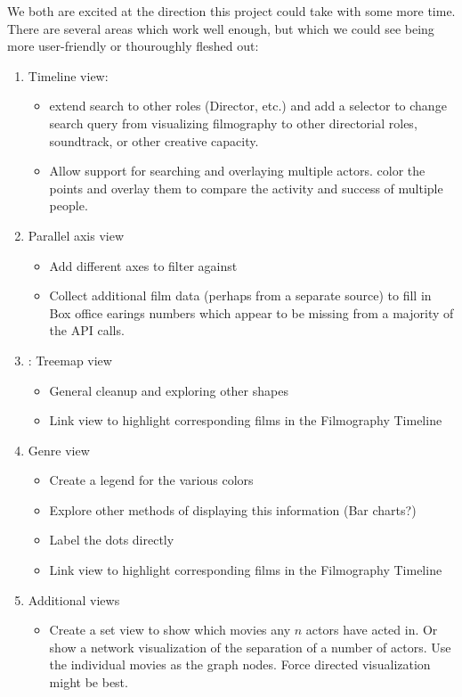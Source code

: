 \documentclass[12pt]{article}
\begin{document}
We both are excited at the direction this project could take with some more time.  There are several areas which work well enough, but which we could see being more user-friendly or thouroughly fleshed out:


\begin{enumerate}

	\item Timeline view:
		\begin{itemize}
			\item extend search to other roles (Director, etc.) and add a selector to change search query from visualizing filmography to other directorial roles, soundtrack, or other creative capacity.  
			\item Allow support for searching and overlaying multiple actors. color the points and overlay them to compare the activity and success of multiple people.
		\end{itemize}
		
	\item Parallel axis view
		\begin{itemize}
			\item Add different axes to filter against
			\item Collect additional film data (perhaps from a separate source) to fill in Box office earings numbers which appear to be missing from a majority of the API calls.
		\end{itemize}
	
	\item: Treemap view
		\begin{itemize}
			\item General cleanup  and exploring other shapes
			\item Link view to highlight corresponding films in the Filmography Timeline
		\end{itemize}

	\item Genre view
		\begin{itemize}
			\item Create a legend for the various colors
			\item Explore other methods of displaying this information (Bar charts?)
			\item Label the dots directly
			\item Link view to highlight corresponding films in the Filmography Timeline
		\end{itemize}
	\item Additional views
		\begin{itemize}
			\item Create a set view to show which movies any $n$ actors have acted in.  Or show a network visualization of the separation of a number of actors.  Use the individual movies as the graph nodes.  Force directed visualization might be best.
		\end{itemize}
\end{enumerate}
\end{document}
